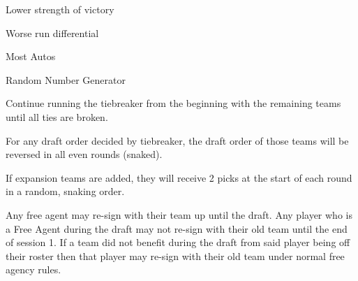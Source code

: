 \begin{deepEnumerate}
\begin{deepEnumerate}
\begin{deepEnumerate}
\begin{deepEnumerate}
				\item Lower strength of victory
				\item Worse run differential
				\item Most Autos
				\item Random Number Generator
			\end{deepEnumerate}
		\end{deepEnumerate}
		\item Continue running the tiebreaker from the beginning with the remaining teams until all ties are broken.
		\item For any draft order decided by tiebreaker, the draft order of those teams will be reversed in all even rounds (snaked).
		\item If expansion teams are added, they will receive 2 picks at the start of each round in a random, snaking order.
	\end{deepEnumerate}
	\item Any free agent may re-sign with their team up until the draft. Any player who is a Free Agent during the draft may
	 not re-sign with their old team until the end of session 1. If a team did not benefit during the draft from said player being
	 off their roster then that player may re-sign with their old team under normal free agency rules. 
\end{deepEnumerate}

